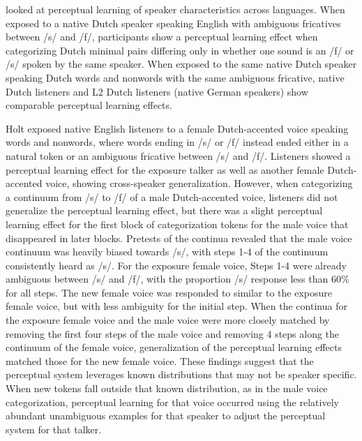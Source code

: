 \citet{Reinisch2013} looked at perceptual learning of speaker characteristics across languages.  
When exposed to a native Dutch speaker speaking English with ambiguous fricatives between /s/ and /f/, participants show a perceptual learning effect when categorizing Dutch minimal pairs differing only in whether one sound is an /f/ or /s/ spoken by the same speaker.  
When exposed to the same native Dutch speaker speaking Dutch words and nonwords with the same ambiguous fricative, native Dutch listeners and L2 Dutch listeners (native German speakers) show comparable perceptual learning effects.

\citet{Reinisch2013a} Holt exposed native English listeners to a female Dutch-accented voice speaking words and nonwords, where words ending in /s/ or /f/ instead ended either in a natural token or an ambiguous fricative between /s/ and /f/.  
Listeners showed a perceptual learning effect for the exposure talker as well as another female Dutch-accented voice, showing cross-speaker generalization.  
However, when categorizing a continuum from /s/ to /f/ of a male Dutch-accented voice, listeners did not generalize the perceptual learning effect, but there was a slight perceptual learning effect for the first block of categorization tokens for the male voice that disappeared in later blocks.  
Pretests of the continua revealed that the male voice continuum was heavily biased towards /s/, with steps 1-4 of the continuum consistently heard as /s/. 
 For the exposure female voice, Steps 1-4 were already ambiguous between /s/ and /f/, with the proportion /s/ response less than 60\% for all steps.  
The new female voice was responded to similar to the exposure female voice, but with less ambiguity for the initial step.  
When the continua for the exposure female voice and the male voice were more closely matched by removing the first four steps of the male voice and removing 4 steps along the continuum of the female voice, generalization of the perceptual learning effects matched those for the new female voice.  
These findings suggest that the perceptual system leverages known distributions that may not be speaker specific.  
When new tokens fall outside that known distribution, as in the male voice categorization, perceptual learning for that voice occurred using the relatively abundant unambiguous examples for that speaker to adjust the perceptual system for that talker.

